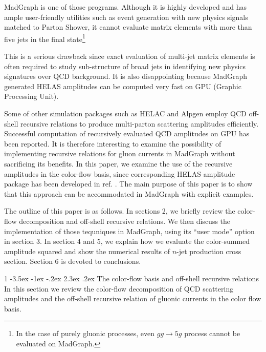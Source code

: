 \documentclass[a4paper,11pt]{article}
\makeatletter
\renewcommand{\section}{%
  \@startsection{section}%
   {1}%
   {\z@}%
   {-3.5ex \@plus -1ex \@minus -.2ex}%
   {2.3ex \@plus.2ex}%
   {\normalfont\large\bfseries}%
}%
\makeatother
\begin{document}
 MadGraph\cite{MG}
is one of those programs. Although it is highly developed and
has ample user-friendly utilities such as event generation with new physics signals
matched to Parton Shower\cite{MG/ME}, it cannot evaluate matrix
elements with more than five jets in the final state\footnote{In the case of
purely gluonic processes, even $gg\rightarrow 5g$ process cannot be
evaluated on MadGraph\cite{GPU2}.}\cite{GPU2}

This is a serious drawback since exact evaluation of multi-jet matrix
elements is often required to study sub-structure of broad jets in
identifying new physics signatures over QCD background. It is also
disappointing because MadGraph generated HELAS amplitudes\cite{HELAS}
can be computed very fast on GPU (Graphic Processing Unit)\cite{GPU1,GPU2}.

Some of other simulation packages such as HELAC and Alpgen\cite{HELAC,Alpgen} employ QCD off-shell recursive
relations to produce multi-parton scattering
amplitudes efficiently. Successful computation of recursively evaluated
QCD amplitudes on GPU has been reported\cite{giele2010}. It is therefore interesting to examine the
possibility of implementing recursive relations for gluon currents in MadGraph without
sacrificing its benefits. In this paper, we examine the use of the
recursive amplitudes in the color-flow basis, since corresponding HELAS
amplitude package has been developed in ref. \cite{fabio}. The main purpose of
this paper is to show that this approach can be accommodated in MadGraph
with explicit examples.

The outline of this paper is as follows. In sections 2, we briefly
review the color-flow decomposition and off-shell recursive relations.
We then discuss the implementation of those tequniques in
MadGraph, using its ``user mode'' option\cite{MG/ME} in section 3. In
section 4 and 5, we explain how we evaluate the color-summed amplitude
squared and show the numerical results of $n$-jet production cross section.
Section 6 is devoted
to conclusions.

 \section{{\normalsize The color-flow basis and off-shell recursive
 relations}}
\label{review}
In this section we review the color-flow decomposition\cite{fabio} of QCD scattering amplitudes and the off-shell recursive relation\cite{berends} of gluonic currents in the color flow basis.
\end{document}
